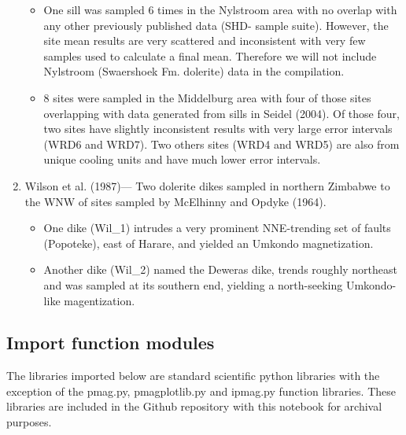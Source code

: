 \documentclass{article}
\providecommand{\tightlist}{%
      \setlength{\itemsep}{0pt}\setlength{\parskip}{0pt}}
\begin{document}
\begin{enumerate}
  \begin{itemize}
  \tightlist
  \item
    One sill was sampled 6 times in the Nylstroom area with no overlap
    with any other previously published data (SHD- sample suite).
    However, the site mean results are very scattered and inconsistent
    with very few samples used to calculate a final mean. Therefore we
    will not include Nylstroom (Swaershoek Fm. dolerite) data in the
    compilation.
  \item
    8 sites were sampled in the Middelburg area with four of those sites
    overlapping with data generated from sills in Seidel (2004). Of
    those four, two sites have slightly inconsistent results with very
    large error intervals (WRD6 and WRD7). Two others sites (WRD4 and
    WRD5) are also from unique cooling units and have much lower error
    intervals.
  \end{itemize}
\item
  Wilson et al. (1987)--- Two dolerite dikes sampled in northern
  Zimbabwe to the WNW of sites sampled by McElhinny and Opdyke (1964).

  \begin{itemize}
  \tightlist
  \item
    One dike (Wil\_1) intrudes a very prominent NNE-trending set of
    faults (Popoteke), east of Harare, and yielded an Umkondo
    magnetization.
  \item
    Another dike (Wil\_2) named the Deweras dike, trends roughly
    northeast and was sampled at its southern end, yielding a
    north-seeking Umkondo-like magentization.
  \end{itemize}
\end{enumerate}

    \subsection{Import function modules}\label{import-function-modules}

The libraries imported below are standard scientific python libraries
with the exception of the pmag.py, pmagplotlib.py and ipmag.py function
libraries. These libraries are included in the Github repository with
this notebook for archival purposes.
\end{document}
